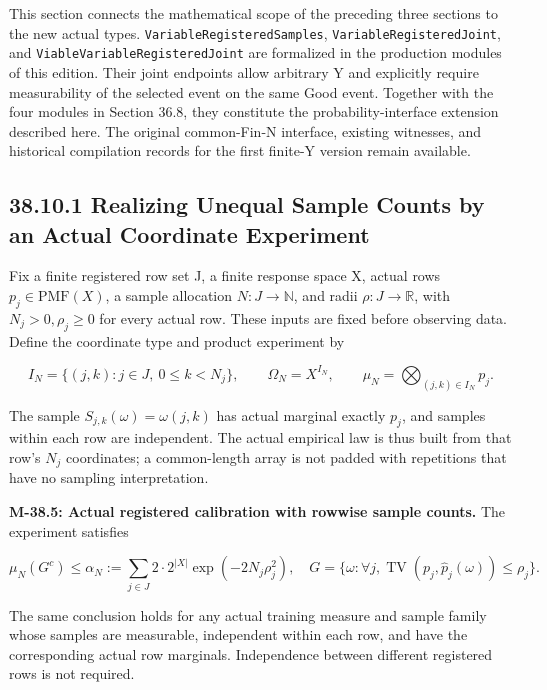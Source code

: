 \documentclass[
  english,
  11pt,
  oneside]{book}
\begin{document}
This section connects the mathematical scope of the preceding three sections to the new actual types. \nolinkurl{VariableRegisteredSamples}, \nolinkurl{VariableRegisteredJoint}, and \nolinkurl{ViableVariableRegisteredJoint} are formalized in the production modules of this edition. Their joint endpoints allow arbitrary Y and explicitly require measurability of the selected event on the same Good event. Together with the four modules in Section 36.8, they constitute the probability-interface extension described here. The original common-Fin-N interface, existing witnesses, and historical compilation records for the first finite-Y version remain available.

\subsection{38.10.1 Realizing Unequal Sample Counts by an Actual Coordinate Experiment}\label{realizing-unequal-sample-counts-by-an-actual-coordinate-experiment}

Fix a finite registered row set J, a finite response space X, actual rows \(p_j\in\mathrm{PMF}(X)\), a sample allocation \(N:J\to\mathbb N\), and radii \(\rho:J\to\mathbb R\), with \(N_j>0,\rho_j\ge0\) for every actual row. These inputs are fixed before observing data. Define the coordinate type and product experiment by

\[I_N=\{(j,k):j\in J,\ 0\le k<N_j\},\qquad
\Omega_N=X^{I_N},\qquad
\mu_N=\bigotimes_{(j,k)\in I_N}p_j.\]

The sample \(S_{j,k}(\omega)=\omega(j,k)\) has actual marginal exactly \(p_j\), and samples within each row are independent. The actual empirical law is thus built from that row's \(N_j\) coordinates; a common-length array is not padded with repetitions that have no sampling interpretation.

\hypertarget{m-38-5}{}\label{m-38-5}

\textbf{M-38.5: Actual registered calibration with rowwise sample counts.} The experiment satisfies

\[\mu_N(G^c)\le
\alpha_N:=\sum_{j\in J}2\cdot2^{|X|}
\exp(-2N_j\rho_j^2),
\quad
G=\{\omega:\forall j,\operatorname{TV}(p_j,\widehat p_j(\omega))\le\rho_j\}.\]

The same conclusion holds for any actual training measure and sample family whose samples are measurable, independent within each row, and have the corresponding actual row marginals. Independence between different registered rows is not required.
\end{document}
